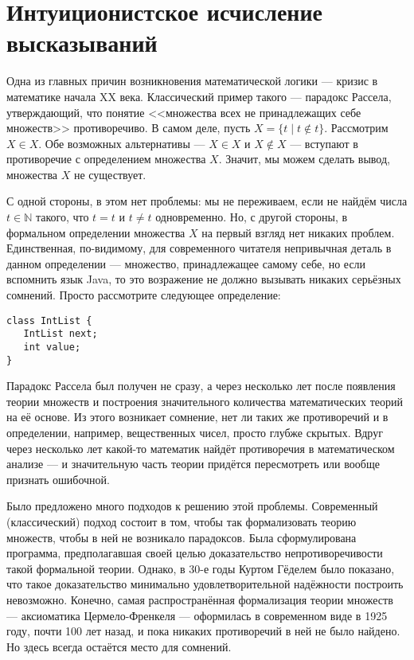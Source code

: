 \section{Интуиционистское исчисление высказываний}

Одна из главных причин возникновения математической логики --- кризис в математике
начала XX века. Классический пример такого --- парадокс Рассела, утверждающий,
что понятие <<множества всех не принадлежащих себе множеств>> противоречиво.
В самом деле, пусть $X = \{ t \mid t \notin t \}$. Рассмотрим $X \in X$.
Обе возможных альтернативы --- $X \in X$ и $X \notin X$ --- вступают в противоречие с 
определением множества $X$. Значит, мы можем сделать вывод, множества $X$ не существует.

С одной стороны, в этом нет проблемы: мы не переживаем, если не найдём числа $t \in \mathbb{N}$ 
такого, что $t=t$ и $t \ne t$ одновременно. Но, с другой стороны, в формальном определении
множества $X$ на первый взгляд нет никаких проблем. Единственная, по-видимому, для современного
читателя непривычная деталь в данном определении --- множество, принадлежащее самому себе, но 
если вспомнить язык Java, то это возражение не должно вызывать никаких серьёзных сомнений.
Просто рассмотрите следующее определение:

\begin{verbatim}
class IntList {
   IntList next;
   int value;
}
\end{verbatim}

Парадокс Рассела был получен не сразу,
а через несколько лет после появления теории множеств и построения значительного количества
математических теорий на её основе. Из этого возникает сомнение, нет ли таких 
же противоречий и в определении, например, вещественных чисел, просто глубже скрытых.
Вдруг через несколько лет какой-то математик найдёт противоречия в математическом анализе --- 
и значительную часть теории придётся пересмотреть или вообще признать ошибочной.

Было предложено много подходов к решению этой проблемы. Современный (классический) подход 
состоит в том, чтобы так формализовать теорию множеств, чтобы в ней не возникало парадоксов.
Была сформулирована программа, предполагавшая своей целью доказательство непротиворечивости
такой формальной теории. Однако, в 30-е годы Куртом Гёделем было показано, что такое 
доказательство минимально удовлетворительной надёжности построить невозможно. Конечно,
самая распространённая формализация теории множеств --- аксиоматика Цермело-Френкеля ---
оформилась в современном виде в 1925 году, почти 100 лет назад, и пока никаких противоречий
в ней не было найдено. Но здесь всегда остаётся место для сомнений.

